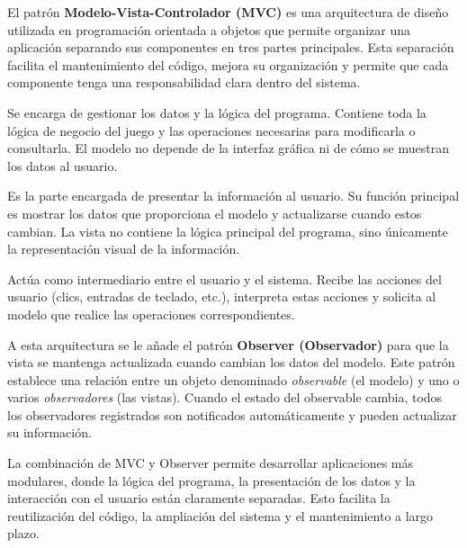\documentclass[12pt, a4paper]{article}
\begin{document}
El patr\'{o}n \textbf{Modelo-Vista-Controlador (MVC)} es una arquitectura de dise\~{n}o utilizada en programaci\'{o}n orientada a objetos que permite organizar una aplicaci\'{o}n separando sus componentes en tres partes principales. Esta separaci\'{o}n facilita el mantenimiento del c\'{o}digo, mejora su organizaci\'{o}n y permite que cada componente tenga una responsabilidad clara dentro del sistema.
 
\begin{description}[leftmargin=2em, style=nextline]
    \item[\textbf{Modelo}]
        Se encarga de gestionar los datos y la l\'{o}gica del programa. Contiene toda la l\'{o}gica de negocio del juego y las operaciones necesarias para modificarla o consultarla. El modelo no depende de la interfaz gr\'{a}fica ni de c\'{o}mo se muestran los datos al usuario.
 
    \item[\textbf{Vista}]
        Es la parte encargada de presentar la informaci\'{o}n al usuario. Su funci\'{o}n principal es mostrar los datos que proporciona el modelo y actualizarse cuando estos cambian. La vista no contiene la l\'{o}gica principal del programa, sino \'{u}nicamente la representaci\'{o}n visual de la informaci\'{o}n.
 
    \item[\textbf{Controlador}]
        Act\'{u}a como intermediario entre el usuario y el sistema. Recibe las acciones del usuario (clics, entradas de teclado, etc.), interpreta estas acciones y solicita al modelo que realice las operaciones correspondientes.
\end{description}
 
A esta arquitectura se le a\~{n}ade el patr\'{o}n \textbf{Observer (Observador)} para que la vista se mantenga actualizada cuando cambian los datos del modelo. Este patr\'{o}n establece una relaci\'{o}n entre un objeto denominado \textit{observable} (el modelo) y uno o varios \textit{observadores} (las vistas). Cuando el estado del observable cambia, todos los observadores registrados son notificados autom\'{a}ticamente y pueden actualizar su informaci\'{o}n.
 
La combinaci\'{o}n de MVC y Observer permite desarrollar aplicaciones m\'{a}s modulares, donde la l\'{o}gica del programa, la presentaci\'{o}n de los datos y la interacci\'{o}n con el usuario est\'{a}n claramente separadas. Esto facilita la reutilizaci\'{o}n del c\'{o}digo, la ampliaci\'{o}n del sistema y el mantenimiento a largo plazo.
 
\end{document}

